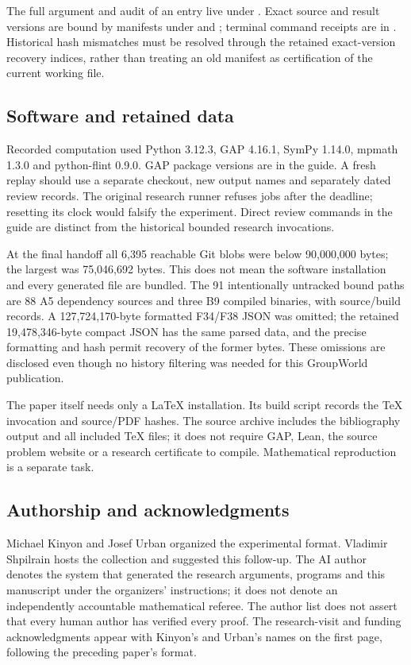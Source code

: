 The full argument and audit of an entry live under
. Exact source and result versions are bound by
manifests under  and
; terminal command receipts are in
. Historical hash mismatches must be resolved through
the retained exact-version recovery indices, rather than treating an
old manifest as certification of the current working file.

\subsection{Software and retained data}
Recorded computation used Python 3.12.3, GAP 4.16.1, SymPy 1.14.0,
mpmath 1.3.0 and python-flint 0.9.0. GAP package versions are in the
guide. A fresh replay should use a separate checkout, new output names
and separately dated review records. The original research runner
refuses jobs after the deadline; resetting its clock would falsify the
experiment. Direct review commands in the guide are distinct from
the historical bounded research invocations.

At the final handoff all 6,395 reachable Git blobs were below
90,000,000 bytes; the largest was 75,046,692 bytes. This does not mean
the software installation and every generated file are bundled. The
91 intentionally untracked bound paths are 88 A5 dependency sources
and three B9 compiled binaries, with source/build records. A
127,724,170-byte formatted F34/F38 JSON was omitted; the retained
19,478,346-byte compact JSON has the same parsed data, and the precise
formatting and hash permit recovery of the former bytes. These omissions
are disclosed even though no history filtering was needed for this
GroupWorld publication.

The paper itself needs only a LaTeX installation. Its build script
records the TeX invocation and source/PDF hashes. The source archive
includes the bibliography output and all included TeX files; it
does not require GAP, Lean, the source problem website or a research
certificate to compile. Mathematical reproduction is a separate task.

\subsection{Authorship and acknowledgments}
Michael Kinyon and Josef Urban organized the experimental format.
Vladimir Shpilrain hosts the collection and suggested this follow-up.
The AI author denotes the system that generated the research arguments,
programs and this manuscript under the organizers' instructions; it does
not denote an independently accountable mathematical referee. The author
list does not assert that every human author has verified every proof.
The research-visit and funding acknowledgments appear with Kinyon's and
Urban's names on the first page, following the preceding paper's format.
